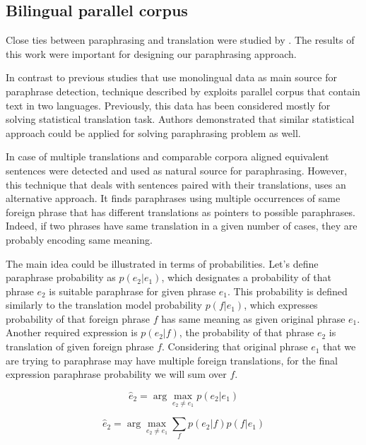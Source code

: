 \subsection{Bilingual parallel corpus}

Close ties between paraphrasing and translation were studied by \cite{Callison-Burch2007}. The results of this work were important for designing our paraphrasing approach. 

In contrast to previous studies that use monolingual data as main source for paraphrase detection, technique described by \cite{Callison-Burch2007} exploits parallel corpus that contain text in two languages. Previously, this data has been considered mostly for solving statistical translation task. Authors demonstrated that similar statistical approach could be applied for solving paraphrasing problem as well.

In case of multiple translations and comparable corpora aligned equivalent sentences were detected and used as natural source for paraphrasing. However, this technique that deals with sentences paired with their translations, uses an alternative approach. It finds paraphrases using multiple occurrences of same foreign phrase that has different translations as pointers to possible paraphrases. Indeed, if two phrases have same translation in a given number of cases, they are probably encoding same meaning.

The main idea could be illustrated in terms of probabilities. Let's define paraphrase probability as $p(e_{2} | e_{1})$, which designates a probability of that phrase $e_{2}$ is suitable paraphrase for given phrase $e_{1}$. This probability is defined similarly to the translation model probability $p(f | e_{1})$, which expresses probability of that foreign phrase $f$ has same meaning as given original phrase $e_{1}$. Another required expression is $p(e_{2} | f)$, the probability of that phrase $e_{2}$ is translation of given foreign phrase $f$. Considering that original phrase $e_{1}$ that we are trying to paraphrase may have multiple foreign translations, for the final expression paraphrase probability we will sum over $f$.

\begin{large}
\begin{equation}
\hat{e}_{2} = \arg\max_{e_{2} \neq e_{1}} p(e_{2} | e_{1})
\end{equation}
\end{large}

\begin{large}
\begin{equation}
\hat{e}_{2} = \arg\max_{e_{2} \neq e_{1}} \sum_{f}p(e_{2} | f)p(f | e_{1})
\end{equation}
\end{large}

